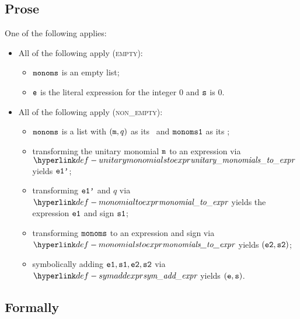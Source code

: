 \subsection{Prose}
One of the following applies:
\begin{itemize}
  \item All of the following apply (\textsc{empty}):
  \begin{itemize}
    \item $\texttt{monoms}$ is an empty list;
    \item $\texttt{e}$ is the literal expression for the integer $0$ and $\texttt{s}$ is $0$.
  \end{itemize}

  \item All of the following apply (\textsc{non\_empty}):
  \begin{itemize}
    \item $\texttt{monoms}$ is a list with $(\texttt{m},q)$ as its \head\ and $\texttt{monoms1}$ as its \tail;
    \item transforming the unitary monomial $\texttt{m}$ to an expression via \\ $\unitarymonomialstoexpr$ yields $\texttt{e1'}$;
    \item transforming $\texttt{e1'}$ and $q$ via $\monomialtoexpr$ yields the expression $\texttt{e1}$ and sign $\texttt{s1}$;
    \item transforming $\texttt{monoms}$ to an expression and sign via $\monomialstoexpr$ yields $(\texttt{e2}, \texttt{s2})$;
    \item symbolically adding $\texttt{e1}, \texttt{s1}, \texttt{e2}, \texttt{s2}$ via $\symaddexpr$ yields $(\texttt{e}, \texttt{s})$.
  \end{itemize}
\end{itemize}

\subsection{Formally}

